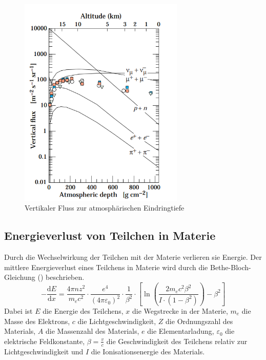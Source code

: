 \documentclass{article}
\begin{document}
\begin{figure}[H]
    \centering
    \includegraphics[width=0.7\textwidth]{figures/Fluss.png}
    \caption{Vertikaler Fluss zur atmosphärischen Eindringtiefe \cite{Naka}}
    \label{fig:Fluss}
\end{figure} 

\subsection{Energieverlust von Teilchen in Materie}
Durch die Wechselwirkung der Teilchen mit der Materie verlieren sie Energie. Der mittlere Energieverlust eines Teilchens in Materie wird durch die Bethe-Bloch-Gleichung (\cite{Bethe}) beschrieben.
\begin{equation*}
    -\frac{\mathrm{d}E}{\mathrm{d}x} = \frac{4\pi n z^2}{m_e c^2} \cdot \frac{e^4}{(4\pi \varepsilon_0)^2} \cdot \frac{1}{\beta^2} \cdot \left[ \ln\left(\frac{2 m_e c^2 \beta^2 }{I\cdot (1-\beta^2)}\right) - \beta^2 \right]    
\end{equation*}
Dabei ist $E$ die Energie des Teilchens, $x$ die Wegstrecke in der Materie, $m_e$ die Masse des Elektrons, $c$ die Lichtgeschwindigkeit, $Z$ die Ordnungszahl des Materials, $A$ die Massenzahl des Materials, $e$ die Elementarladung, $\varepsilon_0$ die elektrische Feldkonstante, $\beta = \frac{v}{c}$ die Geschwindigkeit des Teilchens relativ zur Lichtgeschwindigkeit und $I$ die Ionisationsenergie des Materials. 
\end{document}
